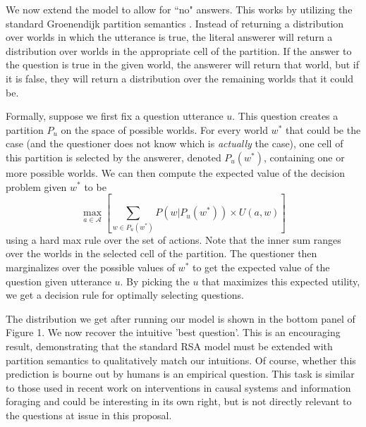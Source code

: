 \documentclass[12pt]{amsart}
\begin{document}
We now extend the model to allow for ``no" answers. This works by utilizing the standard Groenendijk partition semantics \cite{GroenendijkStokhof84_SemanticsOfQuestions}. Instead of returning a distribution over worlds in which the utterance is true, the literal answerer will return a distribution over worlds in the appropriate cell of the partition. If the answer to the question is true in the given world, the answerer will return that world, but if it is false, they will return a distribution over the remaining worlds that it could be. 

Formally, suppose we first fix a question utterance $u$. This question creates a partition $P_u$ on the space of possible worlds. For every world $w^*$ that could be the case (and the questioner does not know which is \emph{actually} the case), one cell of this partition is selected by the answerer, denoted $P_u(w^*)$, containing one or more possible worlds. We can then compute the expected value of the decision problem given $w^*$ to be 
$$\max_{a\in\mathcal{A}}\left[\sum_{w\in P_u(w^*)}P(w|P_u(w^*)) \times U(a, w)\right]$$
using a hard max rule over the set of actions. Note that the inner sum ranges over the worlds in the selected cell of the partition. The questioner then marginalizes over the possible values of $w^*$ to get the expected value of the question given utterance $u$. By picking the $u$ that maximizes this expected utility, we get a decision rule for optimally selecting questions.



%
%

The distribution we get after running our model is shown in the bottom panel of Figure 1. We now recover the intuitive 'best question'. This is an encouraging result, demonstrating that the standard RSA model must be extended with partition semantics to qualitatively match our intuitions. Of course, whether this prediction is bourne out by humans is an empirical question. This task is similar to those used in recent work on interventions in causal systems and information foraging \cite[e.g.]{CoenenRehderGureckis14_InterveneCogSci} and could be interesting in its own right, but is not directly relevant to the questions at issue in this proposal. 
\end{document}
